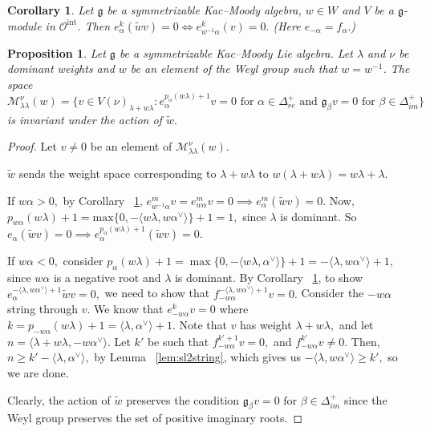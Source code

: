 \documentclass[12pt,reqno]{amsart}
\theoremstyle{plain}
\newtheorem{corollary}[theorem]{Corollary}
\newtheorem{proposition}[theorem]{Proposition}
\theoremstyle{definition}
\theoremstyle{plain}
\newcommand{\posreal}[1][+]{\Delta_{re}^{#1}}
\newcommand{\posimag}{\Delta_{im}^+}
\newcommand{\catoint}{\mathcal{O}^{\mathrm{int}}}
\newcommand{\lie}{\mathfrak}
\begin{document}
\begin{corollary}\label{cor:twistkill}
    Let $\mathfrak{g}$ be a symmetrizable Kac--Moody algebra, $w\in W$ and $V$ be a $\mathfrak{g}$-module in $\catoint$. Then $e_\alpha^k(\widetilde{w}v)=0\iff e_{w^{-1}\alpha}^k(v)=0.$ (Here $e_{-\alpha}=f_{\alpha}.$)
\end{corollary}
 



\begin{proposition}\label{prop:invar}
    Let $\lie g$ be a symmetrizable Kac--Moody Lie algebra. Let $\lambda$ and $\nu$ be dominant weights and $w$ be an element of the Weyl group such that $w=w^{-1}$. The space $$ \mathcal{M}_{\lambda\lambda}^\nu(w)=\bigl\{v \in V(\nu)_{\lambda+w\lambda}: e_\alpha^{p_\alpha(w\lambda)+1} v =0 \text{ for } \alpha \in \posreal \text{ and } {\lie g}_{\beta} v =0 \text{ for } \beta \in \posimag\bigr\}$$ is invariant under the action of $\widetilde{w}.$ 
\end{proposition}
\begin{proof}
    Let $v\neq 0$ be an element of $\mathcal{M}_{\lambda\lambda}^\nu(w).$
    
    $\widetilde{w}$ sends the weight space corresponding to $\lambda+w\lambda$ to $w(\lambda+w\lambda)=w\lambda+\lambda.$ 
    
    If $w\alpha>0,$ by Corollary ~\ref{cor:twistkill}, $e_{w^{-1}\alpha}^mv=e_{w\alpha}^mv=0 \implies  e_{\alpha}^m(\widetilde{w}v)=0.$ Now, $p_{w\alpha}(w\lambda)+1= \text{max}\{0, -\langle w\lambda, w\alpha^\vee\rangle\}+1=1,$ since $\lambda$ is dominant. So $e_\alpha(\widetilde{w}v)=0\implies e_\alpha^{p_\alpha(w\lambda)+1}(\widetilde{w}v)=0.$
    
    If $w\alpha< 0,$ consider $p_\alpha(w\lambda)+1= \max\{0,-\langle w\lambda,\alpha^\vee\rangle\}+1=-\langle\lambda, w\alpha^\vee\rangle+1,$ since $w\alpha$ is a negative root and $\lambda$ is dominant. By Corollary ~\ref{cor:twistkill}, to show $e_{\alpha}^{-\langle\lambda,w\alpha^\vee\rangle+1}\widetilde{w}v=0,$ we need to show that $f_{-w\alpha}^{-\langle\lambda,w\alpha^\vee\rangle+1}v=0.$ Consider the $-w\alpha$ string through $v.$ We know that $e_{-w\alpha}^kv=0$ where $k=p_{-w\alpha}(w\lambda)+1=\langle\lambda,\alpha^\vee\rangle+1.$ Note that $v$ has weight $\lambda+w\lambda,$ and let $n=\langle\lambda+w\lambda,-w\alpha^\vee\rangle.$ Let $k'$ be such that $f^{k'+1}_{-w\alpha}v=0,$ and $f^{k'}_{-w\alpha}v\neq 0.$ Then, $n\ge k'-\langle\lambda,\alpha^\vee\rangle,$ by Lemma ~\ref{lem:sl2string}, which gives us $-\langle\lambda, w\alpha^\vee\rangle\ge k',$ so we are done.
    
    Clearly, the action of $\widetilde{w}$ preserves the condition ${\lie g}_{\beta} v =0 \text{ for } \beta \in \posimag$ since the Weyl group preserves the set of positive imaginary roots.
\end{proof}
\end{document}
